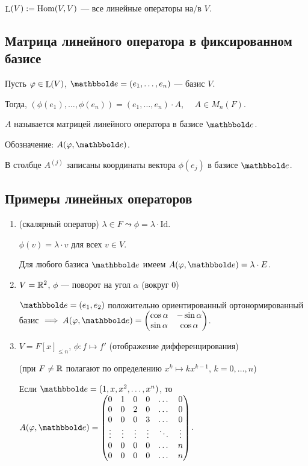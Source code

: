 $\operatorname{\mathop{\mathrm{L}}}(V) := \operatorname{\mathop{\mathrm{Hom}}}(V, V)$ --- все линейные операторы на/в $V$.


\subsection{Матрица линейного оператора в фиксированном базисе}

Пусть $\varphi \in \operatorname{\mathop{\mathrm{L}}}(V)$, $\E = (e_1, \dots, e_n)$ --- базис $V$.

Тогда, $(\phi(e_1), \dots, \phi(e_n)) = (e_1, \dots, e_n) \cdot A$, $\quad A \in M_{n}(F)$.

$A$ называется матрицей линейного оператора в базисе $\E$.

Обозначение: $A(\phi, \E)$.

В столбце $A^{(j)}$ записаны координаты вектора $\phi(e_j)$ в базисе $\E$.


\subsection{Примеры линейных операторов}

\begin{enumerate}
    \item (скалярный оператор) $\lambda \in F \leadsto \phi = \lambda \cdot \mathrm{Id}$.

        $\phi(v) = \lambda \cdot v$ для всех $v \in V$.

        Для любого базиса $\E$ имеем $A(\phi, \E) = \lambda \cdot E$.

    \item $V = \mathbb{R}^2$, $\phi$ --- поворот на угол $\alpha$ (вокруг 0)

        $\E = (e_1, e_2)$ положительно ориентированный ортонормированный базис $\implies A(\phi, \E) = \begin{pmatrix} 
            \cos \alpha & -\sin \alpha \\
            \sin \alpha & \cos \alpha
        \end{pmatrix}$.

    \item $V = F[x]_{\leq n}$, $\phi \colon f \mapsto f'$ (отображение дифференцирования)

        (при $F \neq \mathbb{R}$ полагают по определению $x^k \mapsto kx^{k - 1}$, $k = 0, \dots, n$)

        Если $\E = (1, x, x^2, \dots, x^{n})$, то $A(\phi, \E) = \begin{pmatrix} 
            0 & 1 & 0 & 0 & \dots & 0 \\
            0 & 0 & 2 & 0 & \dots & 0 \\
            0 & 0 & 0 & 3 & \dots & 0 \\
            \vdots & \vdots & \vdots & \vdots & \ddots & \vdots \\
            0 & 0 & 0 & 0 & \dots & n \\
            0 & 0 & 0 & 0 & \dots & n
        \end{pmatrix}$.
\end{enumerate}


